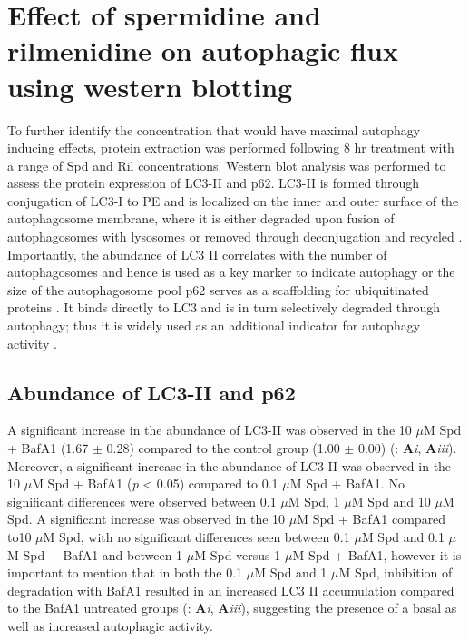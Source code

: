 \section{Effect of spermidine and rilmenidine on autophagic flux using western blotting}
To further identify the concentration that would have maximal autophagy inducing effects, protein extraction was performed following 8 hr treatment with a range of Spd and Ril concentrations. Western blot analysis was performed to assess the protein expression of LC3-II and p62. LC3-II is formed through conjugation of LC3-I to PE and is localized on the inner and outer surface of the autophagosome membrane, where it is either degraded upon fusion of autophagosomes with lysosomes or removed through deconjugation and recycled \citep{kabeya2000}. Importantly, the abundance of LC3 II correlates with the number of autophagosomes and hence is used as a key marker to indicate autophagy or the size of the autophagosome pool \citep{loos2014} p62 serves as a scaffolding for ubiquitinated proteins \citep{sahani2014}. It binds directly to LC3 and is in turn selectively degraded through autophagy; thus it is widely used as an additional indicator for autophagy activity \citep{pankiv2007}.

\subsection{Abundance of LC3-II and p62}
A significant increase in the abundance of LC3-II was observed in the 10 $\mu$M Spd + BafA1 (1.67 $\pm$ 0.28) compared to the control group (1.00 $\pm$ 0.00) (: \textbf{A}\textit{i}, \textbf{A}\textit{iii}). Moreover, a significant increase in the abundance of LC3-II was observed in the 10 $\mu$M Spd + BafA1 (\textit{p} < 0.05) compared to 0.1 $\mu$M Spd + BafA1. No significant differences were observed between 0.1 $\mu$M Spd, 1 $\mu$M Spd and 10 $\mu$M Spd. A significant increase was observed in the 10 $\mu$M Spd + BafA1 compared to10 $\mu$M Spd, with no significant differences seen between 0.1 $\mu$M Spd and 0.1 $\mu$M Spd + BafA1 and between 1 $\mu$M Spd versus 1 $\mu$M Spd + BafA1, however it is important to mention that in both the 0.1 $\mu$M Spd  and 1 $\mu$M Spd, inhibition of degradation with BafA1 resulted in an increased LC3 II accumulation compared to the BafA1 untreated groups (: \textbf{A}\textit{i}, \textbf{A}\textit{iii}), suggesting the presence of a basal as well as increased autophagic activity.

